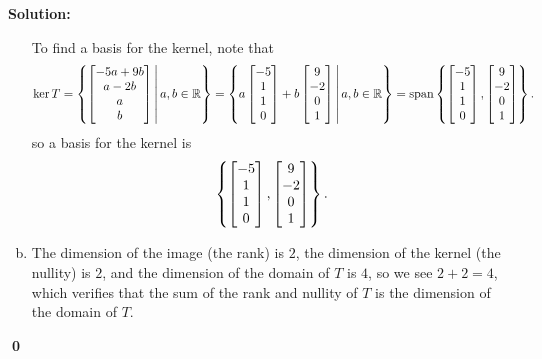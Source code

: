 \documentclass{article}
\newenvironment{solution}
{
  \ignorespaces
  \textbf{Solution:}
}
{
  \ignorespacesafterend
  \begin{flushright}
  {\bfseries \qed}
  \end{flushright}
}
\begin{document}
\begin{solution}
\begin{enumerate}[(a)]
To find a basis for the kernel, note that 
\[ \ker T = \left\{\begin{bmatrix}-5a+9b \\ a-2b \\ a \\ b \end{bmatrix}\,\middle|\,a,b \in \mathbb{R}\right\} 
= \left\{a \begin{bmatrix}-5 \\ 1 \\ 1  \\ 0 \end{bmatrix}+b \begin{bmatrix} 9 \\ -2 \\ 0 \\ 1 \end{bmatrix}\,\middle|\,a,b \in \mathbb{R}\right\}
= \operatorname{span}\left\{ \begin{bmatrix} -5 \\ 1 \\ 1 \\ 0 \end{bmatrix}, \begin{bmatrix} 9 \\ -2 \\ 0 \\ 1 \end{bmatrix}\right\}.\]
so a basis for the kernel is
\[\left\{\begin{bmatrix}-5 \\ 1 \\ 1 \\ 0 \end{bmatrix},
\begin{bmatrix}9 \\ -2 \\ 0 \\ 1 \end{bmatrix}\right\}.\]
\item The dimension of the image (the rank) is \(2\), the dimension of the kernel (the nullity) is \(2\), and the dimension of the domain of \(T\) is \(4\), so we see \(2+2=4\), which verifies that the sum of the rank and nullity of \(T\) is the dimension of the domain of \(T\).
\end{enumerate}
\end{solution}
\end{document}
